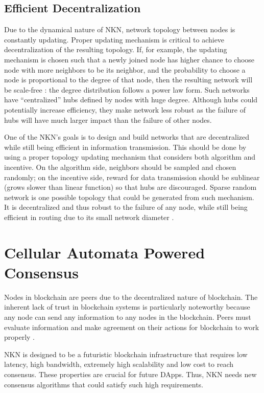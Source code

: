 \documentclass[reprint,pre,aps]{revtex4-1}
\begin{document}
\subsection{Efficient Decentralization}

Due to the dynamical nature of NKN, network topology between nodes is constantly updating. Proper updating mechanism is critical to achieve decentralization of the resulting topology. If, for example, the updating mechanism is chosen such that a newly joined node has higher chance to choose node with more neighbors to be its neighbor, and the probability to choose a node is proportional to the degree of that node, then the resulting network will be scale-free \cite{barabasi1999emergence}: the degree distribution follows a power law form. Such networks have “centralized” hubs defined by nodes with huge degree. Although hubs could potentially increase efficiency, they make network less robust as the failure of hubs will have much larger impact than the failure of other nodes. 

One of the NKN's goals is to design and build networks that are decentralized while still being efficient in information transmission. This should be done by using a proper topology updating mechanism that considers both algorithm and incentive. On the algorithm side, neighbors should be sampled and chosen randomly; on the incentive side, reward for data transmission should be sublinear (grows slower than linear function) so that hubs are discouraged. Sparse random network is one possible topology that could be generated from such mechanism. It is decentralized and thus robust to the failure of any node, while still being efficient in routing due to its small network diameter \cite{chung2001diameter}.

\section{Cellular Automata Powered Consensus}

Nodes in blockchain are peers due to the decentralized nature of blockchain. The inherent lack of trust in blockchain systems is particularly noteworthy because any node can send any information to any nodes in the blockchain. Peers must evaluate information and make agreement on their actions for blockchain to work properly \cite{baliga2017understanding}.

NKN is designed to be a futuristic blockchain infrastructure that requires low latency, high bandwidth, extremely high scalability and low cost to reach consensus. These properties are crucial for future DApps. Thus, NKN needs new consensus algorithms that could satisfy such high requirements.
\end{document}
